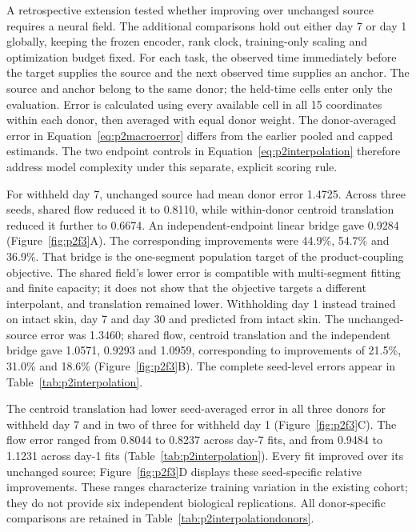 \documentclass[10pt,a4paper]{article}
\begin{document}
A retrospective extension tested whether improving over unchanged source requires a neural field. The additional comparisons hold out either day 7 or day 1 globally, keeping the frozen encoder, rank clock, training-only scaling and optimization budget fixed. For each task, the observed time immediately before the target supplies the source and the next observed time supplies an anchor. The source and anchor belong to the same donor; the held-time cells enter only the evaluation. Error is calculated using every available cell in all 15 coordinates within each donor, then averaged with equal donor weight. The donor-averaged error in Equation~\eqref{eq:p2macroerror} differs from the earlier pooled and capped estimands. The two endpoint controls in Equation~\eqref{eq:p2interpolation} therefore address model complexity under this separate, explicit scoring rule.

For withheld day 7, unchanged source had mean donor error 1.4725. Across three seeds, shared flow reduced it to 0.8110, while within-donor centroid translation reduced it further to 0.6674. An independent-endpoint linear bridge gave 0.9284 (Figure~\ref{fig:p2f3}A\label{call:p2f3}). The corresponding improvements were 44.9\%, 54.7\% and 36.9\%. That bridge is the one-segment population target of the product-coupling objective. The shared field's lower error is compatible with multi-segment fitting and finite capacity; it does not show that the objective targets a different interpolant, and translation remained lower. Withholding day 1 instead trained on intact skin, day 7 and day 30 and predicted from intact skin. The unchanged-source error was 1.3460; shared flow, centroid translation and the independent bridge gave 1.0571, 0.9293 and 1.0959, corresponding to improvements of 21.5\%, 31.0\% and 18.6\% (Figure~\ref{fig:p2f3}B). The complete seed-level errors appear in Table~\ref{tab:p2interpolation}.




The centroid translation had lower seed-averaged error in all three donors for withheld day 7 and in two of three for withheld day 1 (Figure~\ref{fig:p2f3}C). The flow error ranged from 0.8044 to 0.8237 across day-7 fits, and from 0.9484 to 1.1231 across day-1 fits (Table~\ref{tab:p2interpolation}). Every fit improved over its unchanged source; Figure~\ref{fig:p2f3}D displays these seed-specific relative improvements. These ranges characterize training variation in the existing cohort; they do not provide six independent biological replications. All donor-specific comparisons are retained in Table~\ref{tab:p2interpolationdonors}.
\end{document}
